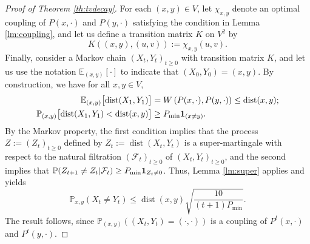 \documentclass[JEP,XML,SOM,Unicode,NoEqCountersInSection,published]{cedram}
\theoremstyle{definition}
\newcommand{\EE}{{\mathbb{E}}}
\newcommand{\PP}{{\mathbb{P}}}
\newcommand{\cF}{\mathcal {F}}
\newcommand{\pmin}{P_{\mathrm{min}}}
\DeclareMathOperator{\dist}{dist}
\begin{document}
\begin{proof}[Proof of Theorem \ref{th:tvdecay}]For each $(x,y)\in V$, let $\chi_{x,y}$ denote an optimal coupling of $P(x,\cdot)$ and $P(y,\cdot)$ satisfying the condition in Lemma \ref{lm:coupling}, and let us define a transition matrix $K$ on $V^2$ by
\begin{equation*}
K((x,y),(u,v)) := \chi_{x,y}(u,v).
\end{equation*}
Finally, consider a Markov chain $(X_t,Y_t)_{t\ge 0}$ with transition matrix $K$, and let us use the notation $\EE_{(x,y)}[\cdot]$ to indicate that $(X_0,Y_0)=(x,y)$. By construction, we have for all $x,y\in V$,
\begin{align*}
\EE_{(x,y)} \bigl[\dist(X_{1},Y_{1}) \bigr] & = W\left(P(x,\cdot),P(y,\cdot)\right)\le \dist(x,y);\\
\PP_{(x,y)}\bigl[\dist(X_1,Y_1)<\dist(x,y)\bigr] & \ge \pmin{\bf 1}_{(x\ne y)}.
\end{align*}
By the Markov property, the first condition implies that the process $Z:=(Z_t)_{t\ge 0}$ defined by
$
Z_t := \dist(X_t,Y_t)
$
is a super-martingale with respect to the natural filtration $(\cF_t)_{t\ge 0}$ of $(X_t,Y_t)_{t\ge 0}$, and the second implies that $\PP(Z_{t+1}\ne Z_t|\cF_t)\ge\pmin{\bf 1}_{Z_t\ne 0}$. Thus, Lemma \ref{lm:super} applies and yields
\begin{equation*}
\PP_{x,y}(X_t\ne Y_t) \le \dist(x,y)\sqrt{\frac{10}{ (t+1)\pmin}}.
\end{equation*}
The result follows, since $\PP_{(x,y)}\left((X_t,Y_t)=(\cdot,\cdot)\right)$ is a coupling of $P^t(x,\cdot)$ and $P^t(y,\cdot)$.
\end{proof}




\end{document}
